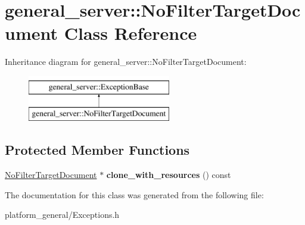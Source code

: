 \hypertarget{classgeneral__server_1_1NoFilterTargetDocument}{\section{general\-\_\-server\-:\-:\-No\-Filter\-Target\-Document \-Class \-Reference}
\label{classgeneral__server_1_1NoFilterTargetDocument}
}
\-Inheritance diagram for general\-\_\-server\-:\-:\-No\-Filter\-Target\-Document\-:\begin{figure}[H]
\begin{center}
\leavevmode
\includegraphics[height=2.000000cm]{classgeneral__server_1_1NoFilterTargetDocument}
\end{center}
\end{figure}
\subsection*{\-Protected \-Member \-Functions}
\begin{DoxyCompactItemize}
\item 
\hypertarget{classgeneral__server_1_1NoFilterTargetDocument_aa70bb40008c085b9a9935a7672e6f86e}{\hyperlink{classgeneral__server_1_1NoFilterTargetDocument}{\-No\-Filter\-Target\-Document} $\ast$ {\bfseries clone\-\_\-with\-\_\-resources} () const }\label{classgeneral__server_1_1NoFilterTargetDocument_aa70bb40008c085b9a9935a7672e6f86e}

\end{DoxyCompactItemize}


\-The documentation for this class was generated from the following file\-:\begin{DoxyCompactItemize}
\item 
platform\-\_\-general/\-Exceptions.\-h\end{DoxyCompactItemize}
